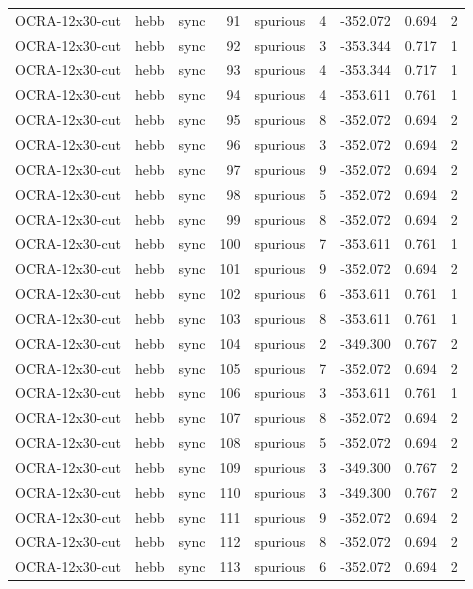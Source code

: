 \begin{tabular}{lllrlrrrr}
OCRA-12x30-cut & hebb & sync & 91 & spurious & 4 & -352.072 & 0.694 & 2 \\
OCRA-12x30-cut & hebb & sync & 92 & spurious & 3 & -353.344 & 0.717 & 1 \\
OCRA-12x30-cut & hebb & sync & 93 & spurious & 4 & -353.344 & 0.717 & 1 \\
OCRA-12x30-cut & hebb & sync & 94 & spurious & 4 & -353.611 & 0.761 & 1 \\
OCRA-12x30-cut & hebb & sync & 95 & spurious & 8 & -352.072 & 0.694 & 2 \\
OCRA-12x30-cut & hebb & sync & 96 & spurious & 3 & -352.072 & 0.694 & 2 \\
OCRA-12x30-cut & hebb & sync & 97 & spurious & 9 & -352.072 & 0.694 & 2 \\
OCRA-12x30-cut & hebb & sync & 98 & spurious & 5 & -352.072 & 0.694 & 2 \\
OCRA-12x30-cut & hebb & sync & 99 & spurious & 8 & -352.072 & 0.694 & 2 \\
OCRA-12x30-cut & hebb & sync & 100 & spurious & 7 & -353.611 & 0.761 & 1 \\
OCRA-12x30-cut & hebb & sync & 101 & spurious & 9 & -352.072 & 0.694 & 2 \\
OCRA-12x30-cut & hebb & sync & 102 & spurious & 6 & -353.611 & 0.761 & 1 \\
OCRA-12x30-cut & hebb & sync & 103 & spurious & 8 & -353.611 & 0.761 & 1 \\
OCRA-12x30-cut & hebb & sync & 104 & spurious & 2 & -349.300 & 0.767 & 2 \\
OCRA-12x30-cut & hebb & sync & 105 & spurious & 7 & -352.072 & 0.694 & 2 \\
OCRA-12x30-cut & hebb & sync & 106 & spurious & 3 & -353.611 & 0.761 & 1 \\
OCRA-12x30-cut & hebb & sync & 107 & spurious & 8 & -352.072 & 0.694 & 2 \\
OCRA-12x30-cut & hebb & sync & 108 & spurious & 5 & -352.072 & 0.694 & 2 \\
OCRA-12x30-cut & hebb & sync & 109 & spurious & 3 & -349.300 & 0.767 & 2 \\
OCRA-12x30-cut & hebb & sync & 110 & spurious & 3 & -349.300 & 0.767 & 2 \\
OCRA-12x30-cut & hebb & sync & 111 & spurious & 9 & -352.072 & 0.694 & 2 \\
OCRA-12x30-cut & hebb & sync & 112 & spurious & 8 & -352.072 & 0.694 & 2 \\
OCRA-12x30-cut & hebb & sync & 113 & spurious & 6 & -352.072 & 0.694 & 2 \\

\end{tabular}

